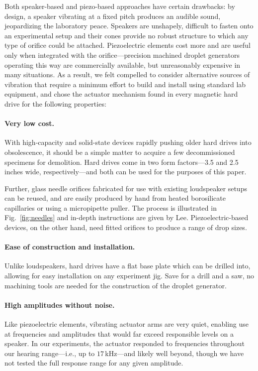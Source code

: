 \documentclass[11.5pt]{book}
\newcommand*{\figref}[1]{Fig.~\ref{#1}}
\begin{document}
Both speaker-based and piezo-based approaches have certain drawbacks: by design,
a speaker vibrating at a fixed pitch produces an audible sound, jeopardizing the
laboratory peace. Speakers are unshapely, difficult to fasten onto an
experimental setup and their cones provide no robust structure to which any type
of orifice could be attached. Piezoelectric elements cost more and are useful
only when integrated with the orifice---precision machined droplet generators
operating this way are commercially available, but unreasonably expensive in
many situations. As a result, we felt compelled to consider alternative sources
of vibration that require a minimum effort to build and install using standard
lab equipment, and chose the actuator mechanism found in every magnetic hard
drive for the following properties:

\paragraph*{Very low cost.} With high-capacity and solid-state devices rapidly pushing older hard drives
into obsolescence, it should be a simple matter to acquire a few decommissioned specimens for
demolition. Hard drives come in two form factors---3.5 and 2.5 inches wide,
respectively---and both can be used for the purposes of this paper. 

Further, glass needle orifices fabricated for use with existing loudspeaker
setups can be reused, and are easily produced by hand from heated borosilicate
capillaries or using a micropipette puller. The process is illustrated in
\figref{fig:needles} and in-depth instructions are given by Lee\cite{Lee02}.
Piezoelectric-based devices, on the other hand, need fitted orifices to produce
a range of drop sizes.

\paragraph*{Ease of construction and installation.} Unlike loudspeakers, hard
drives have a flat base plate which can be drilled into, allowing for easy
installation on any experiment jig. Save for a drill and a saw, no machining
tools are needed for the construction of the droplet generator.

\paragraph*{High amplitudes without noise.}
Like piezoelectric elements, vibrating actuator arms are very quiet, enabling
use at frequencies and amplitudes that would far exceed responsible levels on
a speaker.  In our experiments, the actuator responded to frequencies throughout
our hearing range---i.e., up to $17\,$kHz---and likely well beyond, though we
have not tested the full response range for any given amplitude.
\end{document}
